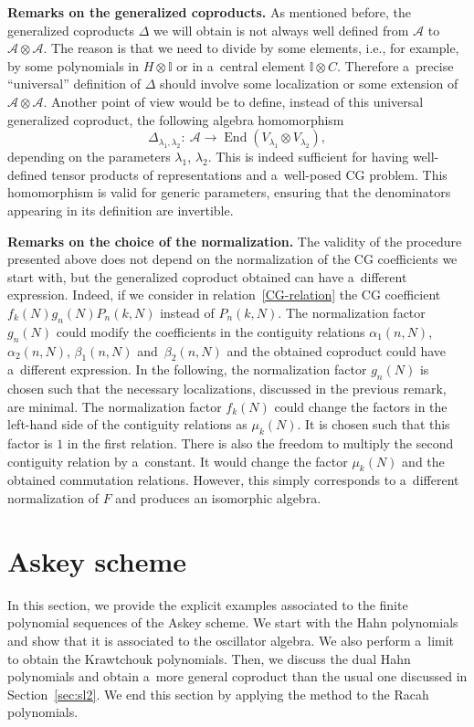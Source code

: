 \documentclass[10pt,a4paper]{amsart}
\numberwithin{equation}{section}
\theoremstyle{definition}
\begin{document}
{\bf Remarks on the generalized coproducts.} As mentioned before, the generalized coproducts $\Delta$ we will obtain is not always well defined from $\mathcal{A}$ to $\mathcal{A}\otimes \mathcal{A}$. The reason is that we need to divide by some elements, i.e., for example, by some polynomials in $H\otimes \mathbb{I}$ or in a~central element $\mathbb{I}\otimes C$. Therefore a~precise ``universal'' definition of $\Delta$ should involve some localization or some extension of $\mathcal{A}\otimes\mathcal{A}$. Another point of view would be to define, instead of this universal generalized coproduct, the following algebra homomorphism
\[\Delta_{\lambda_1,\lambda_2}\colon \ \mathcal{A} \to \operatorname{End}(V_{\lambda_1}\otimes V_{\lambda_2}),\]
depending on the parameters $\lambda_1$, $\lambda_2$. This is indeed sufficient for having well-defined tensor products of representations and a~well-posed CG problem. This homomorphism is valid for generic parameters, ensuring that the denominators appearing in its definition are invertible.

{\bf Remarks on the choice of the normalization.} The validity of the procedure presented above does not depend on the normalization of the CG coefficients we start with, but the generalized coproduct obtained can have a~different expression. Indeed, if we consider in relation~\eqref{CG-relation} the CG coefficient $f_k(N)g_n(N)P_n(k,N)$ instead of $P_n(k,N)$. The normalization factor~$g_n(N)$ could modify the coefficients in the contiguity relations $\alpha_1(n,N)$, $\alpha_2(n,N)$, $\beta_1(n,N)$ and~$\beta_2(n,N)$ and the obtained coproduct could have a~different expression. In the following, the normalization factor $g_n(N)$ is chosen such that the necessary localizations, discussed in the previous remark, are minimal. The normalization factor $f_k(N)$ could change the factors in the left-hand side of the contiguity relations as $\mu_k(N)$. It is chosen such that this factor is $1$ in the first relation.
There is also the freedom to multiply the second contiguity relation by a~constant. It would change the factor $\mu_k(N)$ and the obtained commutation relations. However, this simply corresponds to a~different normalization of $F$ and produces an isomorphic algebra.

\section{Askey scheme} \label{sec:askey}

In this section, we provide the explicit examples associated to the finite polynomial sequences of the Askey scheme. We start with the Hahn polynomials and show that it is associated to the oscillator algebra. We also perform a~limit to obtain the Krawtchouk polynomials. Then, we discuss the dual Hahn polynomials and obtain a~more general coproduct than the usual one discussed in Section~\ref{sec:sl2}. We end this section by applying the method to the Racah polynomials.
\end{document}
